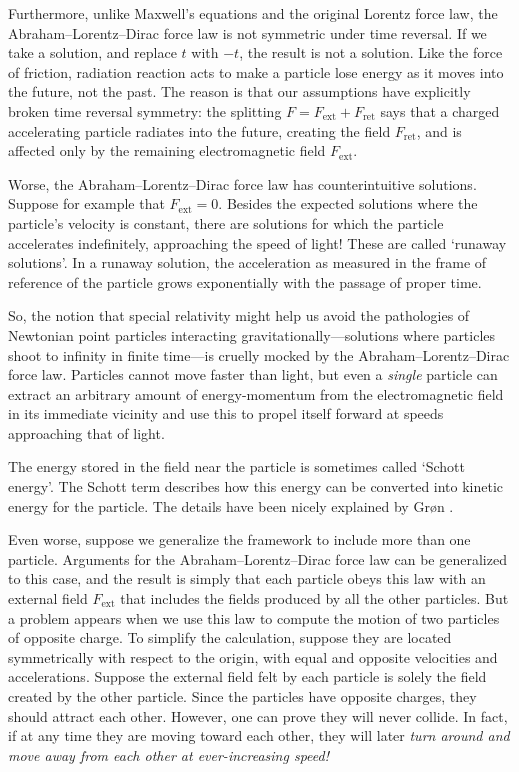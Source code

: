 \documentclass{article}
\newcommand{\ret}{\mathrm{ret}}
\newcommand{\ext}{\mathrm{ext}}
\begin{document}
Furthermore, unlike Maxwell's equations and the original Lorentz force law, 
the Abraham--Lorentz--Dirac force law is not symmetric under time reversal.   
If we take a solution, and replace $t$ with $-t$, the result is not a solution.  
Like the force of friction, radiation reaction acts to make a particle lose energy as it moves into the future, not the past.  The reason is that our assumptions 
have explicitly broken time reversal symmetry: the splitting $F = F_\ext + F_\ret$ 
says that a charged accelerating particle radiates into the future, creating the field 
$F_\ret$, and is affected only by the remaining electromagnetic field $F_\ext$.

Worse, the Abraham--Lorentz--Dirac force law has counterintuitive solutions.   Suppose for example that $F_\ext = 0$.   Besides the expected solutions where the particle's velocity is constant, there are solutions for which the particle accelerates
indefinitely, approaching the speed of light!   These are called `runaway solutions'.
In a runaway solution, the acceleration as measured in the frame of reference of the particle grows exponentially with the passage of proper time.  

So, the notion that special relativity might help us avoid the pathologies of
Newtonian point particles interacting gravitationally---solutions where 
particles shoot to infinity in finite time---is cruelly mocked by the 
Abraham--Lorentz--Dirac force law.  Particles cannot move faster than light, but even a \emph{single} particle can extract an arbitrary amount of energy-momentum from the electromagnetic field in its immediate vicinity and use this to propel itself forward at speeds approaching that of light.  

The energy stored in the field near the particle is sometimes called `Schott energy'.    The Schott term describes how this energy can be converted into kinetic energy for the particle.  The details have been nicely explained by Gr\o n \cite{Gron}.

Even worse, suppose we generalize the framework to include more than one
particle.  Arguments for the Abraham--Lorentz--Dirac force law can be generalized to  this case, and the result is simply that each particle obeys this law with an 
external field $F_\ext$ that includes the fields produced by all the other particles.  
But a problem appears when we use this law to compute the motion of two particles of opposite charge.   To simplify the calculation, suppose they are located symmetrically with respect to the origin, with equal and opposite velocities and accelerations.   Suppose the external field felt by each particle is solely the field created by the other particle.   Since the particles have opposite charges, they should attract each other.  However, one can prove they will never collide.  In fact, if at any time they are moving toward each other, they will later \emph{turn around and move away from each other at ever-increasing speed!}
\end{document}
